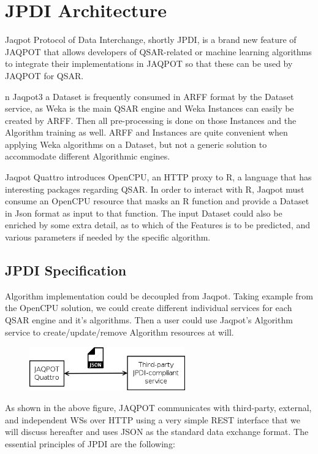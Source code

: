 \chapter{JPDI Architecture}
Jaqpot Protocol of Data Interchange, shortly JPDI, 
is a brand new feature of JAQPOT that allows developers 
of QSAR-related or machine learning algorithms to 
integrate their implementations in JAQPOT so that these
can be used by JAQPOT for QSAR.


n Jaqpot3 a Dataset is frequently consumed in ARFF format by the Dataset service, 
as Weka is the main QSAR engine and Weka Instances can easily be created by ARFF. 
Then all pre-processing is done on those Instances and the Algorithm training as well. 
ARFF and Instances are quite convenient when applying Weka algorithms on a Dataset, 
but not a generic solution to accommodate different Algorithmic engines.
 
Jaqpot Quattro introduces OpenCPU, an HTTP proxy to R, a language that has 
interesting packages regarding QSAR. In order to interact with R, Jaqpot must consume an 
OpenCPU resource that masks an R function and provide a Dataset in Json format as input 
to that function. The input Dataset could also be enriched by some extra detail, as to 
which of the Features is to be predicted, and various parameters if 
needed by the specific algorithm.


\section{JPDI Specification}
Algorithm implementation could be decoupled from Jaqpot. 
Taking example from the OpenCPU solution, we could create different 
individual services for each QSAR engine and it’s algorithms. Then a user could 
use Jaqpot's Algorithm service to create/update/remove Algorithm resources at will. 

\begin{figure}[h]
 \centering
 \includegraphics[keepaspectratio=true,width=0.6\textwidth]{figures/JPDI_general.png}
\end{figure}

As shown in the above figure, JAQPOT communicates with 
third-party, external, and independent WSs over HTTP
using a very simple REST interface that we will discuss
hereafter and uses JSON as the standard data exchange format.
The essential principles of JPDI are the following:


